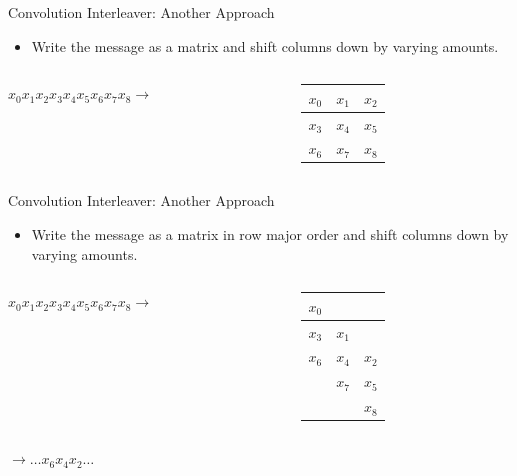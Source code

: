 \documentclass[aspectratio=169]{beamer}
\begin{document}
\begin{frame}{Convolution Interleaver: Another Approach}
    \begin{itemize}
        \item Write the message as a matrix and shift columns down by varying amounts.
    \end{itemize}

    \begin{columns}[c]
    \begin{column}{1cm}
        $x_0 x_1 x_2 x_3 x_4 x_5 x_6 x_7 x_8 \to$
    \end{column}
    \hfill
    \begin{column}{5cm}
    \begin{table}
        \centering
        \begin{tabular}{|c|c|c|}
            \hline
            $x_0$ & $x_1$ & $x_2$ \\ \hline
            $x_3$ & $x_4$ & $x_5$ \\ \hline
            $x_6$ & $x_7$ & $x_8$ \\ \hline
        \end{tabular}
    \end{table}
    \end{column}
    \end{columns}
\end{frame}


\begin{frame}{Convolution Interleaver: Another Approach}
    \begin{itemize}
        \item Write the message as a matrix in row major order and shift columns down by varying amounts.
    \end{itemize}

    \begin{columns}[c]
    \begin{column}{1cm}
        $x_0 x_1 x_2 x_3 x_4 x_5 x_6 x_7 x_8 \to$
    \end{column}
    \hfill
    \begin{column}{5cm}
    \begin{table}
        \centering
        \begin{tabular}{|c|c|c|}
            \hline
            $x_0$ &   &   \\ \hline
            $x_3$ & $x_1$ &   \\ \hline
            $x_6$ & $x_4$ & $x_2$ \\ \hline
              & $x_7$ & $x_5$ \\ \hline
              &   & $x_8$ \\ \hline
        \end{tabular}
    \end{table}
    \end{column}
    \end{columns}

    \bigskip
    
    $\to \ldots x_6 x_4 x_2 \ldots$
\end{frame}
\end{document}
